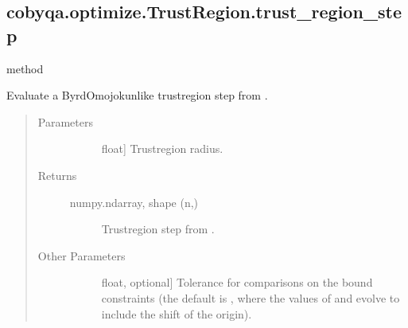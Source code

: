 \documentclass[letterpaper,10pt,english]{sphinxmanual}
\begin{document}
\begin{fulllineitems}
\begin{fulllineitems}
\begin{quote}
\begin{description}
\begin{description}
\end{description}

\end{description}\end{quote}

\end{fulllineitems}



\subsection{cobyqa.optimize.TrustRegion.trust\_region\_step}
\label{\detokenize{refs/generated/cobyqa.optimize.TrustRegion.trust_region_step:cobyqa-optimize-trustregion-trust-region-step}}\label{\detokenize{refs/generated/cobyqa.optimize.TrustRegion.trust_region_step::doc}}
\sphinxAtStartPar
method

\begin{fulllineitems}
\label{\detokenize{refs/generated/cobyqa.optimize.TrustRegion.trust_region_step:cobyqa.optimize.TrustRegion.trust_region_step}}
\sphinxAtStartPar
Evaluate a Byrd\sphinxhyphen{}Omojokun\sphinxhyphen{}like trust\sphinxhyphen{}region step from .
\begin{quote}\begin{description}
\item[{Parameters}] \leavevmode\begin{description}
\item[{}] \leavevmode{[}float{]}
\sphinxAtStartPar
Trust\sphinxhyphen{}region radius.

\end{description}

\item[{Returns}] \leavevmode\begin{description}
\item[{numpy.ndarray, shape (n,)}] \leavevmode
\sphinxAtStartPar
Trust\sphinxhyphen{}region step from .

\end{description}

\item[{Other Parameters}] \leavevmode\begin{description}
\item[{}] \leavevmode{[}float, optional{]}
\sphinxAtStartPar
Tolerance for comparisons on the bound constraints (the default is
, where the
values of  and  evolve to include the shift of the
origin).


\end{description}
\end{description}
\end{quote}
\end{fulllineitems}
\end{fulllineitems}
\end{document}
